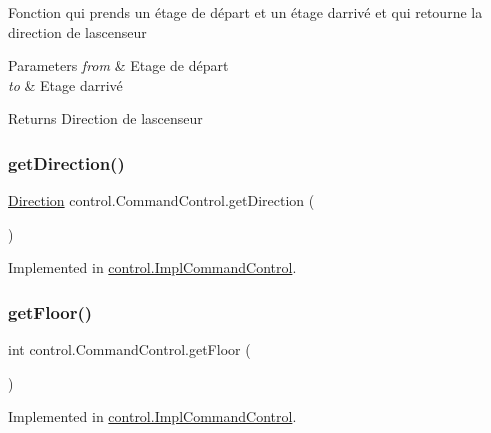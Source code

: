 Fonction qui prends un étage de départ et un étage d\textquotesingle{}arrivé et qui retourne la direction de l\textquotesingle{}ascenseur 
\begin{DoxyParams}{Parameters}
{\em from} & Etage de départ \\
\hline
{\em to} & Etage d\textquotesingle{}arrivé \\
\hline
\end{DoxyParams}
\begin{DoxyReturn}{Returns}
Direction de l\textquotesingle{}ascenseur 
\end{DoxyReturn}
\mbox{\label{interfacecontrol_1_1_command_control_af668873aadd297c71867fa707b5ecd55}} 
\subsubsection{\texorpdfstring{getDirection()}{getDirection()}}
{\footnotesize\ttfamily \mbox{\hyperlink{enumcontrol_1_1command_1_1_direction}{Direction}} control.\+Command\+Control.\+get\+Direction (\begin{DoxyParamCaption}{ }\end{DoxyParamCaption})}



Implemented in \mbox{\hyperlink{classcontrol_1_1_impl_command_control_a9734880304099b72e4a65dbfe6a510a1}{control.\+Impl\+Command\+Control}}.

\mbox{\label{interfacecontrol_1_1_command_control_abfefcf986aceb87768275e04df3653f5}} 
\subsubsection{\texorpdfstring{getFloor()}{getFloor()}}
{\footnotesize\ttfamily int control.\+Command\+Control.\+get\+Floor (\begin{DoxyParamCaption}{ }\end{DoxyParamCaption})}



Implemented in \mbox{\hyperlink{classcontrol_1_1_impl_command_control_a03e231769f2023d9f381980a34057ad6}{control.\+Impl\+Command\+Control}}.

